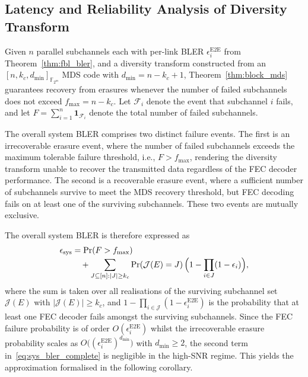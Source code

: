 \documentclass[lettersize,journal]{IEEEtran}
\begin{document}
\subsection{Latency and Reliability Analysis of Diversity Transform}
\label{sec:latency_reliability}

Given $n$ parallel subchannels each with per-link BLER
$\epsilon_i^{\mathrm{E2E}}$ from Theorem~\ref{thm:fbl_bler}, and a
diversity transform constructed from an
$[n, k_c, d_{\min}]_{\mathbb{F}_{2^m}}$ MDS code with
$d_{\min} = n - k_c + 1$, Theorem~\ref{thm:block_mds} guarantees
recovery from erasures whenever the number of failed subchannels does not
exceed $f_{\max} = n - k_c$. Let $\mathcal{F}_i$ denote the event
that subchannel $i$ fails, and let
$F = \sum_{i=1}^n \mathbf{1}_{\mathcal{F}_i}$ denote the total
number of failed subchannels.

The overall system BLER comprises two distinct failure events.
The first is an irrecoverable erasure event, where the number of
failed subchannels exceeds the maximum tolerable failure threshold,
i.e., $F > f_{\max}$, rendering the diversity transform unable to
recover the transmitted data regardless of the FEC decoder
performance. The second is a recoverable erasure event, where a
sufficient number of subchannels survive to meet the MDS recovery
threshold, but FEC decoding fails on at least one of the surviving
subchannels. These two events are mutually exclusive.

The overall system BLER is therefore expressed as
\begin{equation}
\begin{aligned}
\epsilon_{\mathrm{sys}} &= \Pr\!\left(F > f_{\max}\right) \\[-2pt]
&\quad + \sum_{J\subseteq[n]:|J|\geq k_c}
\Pr\!\left(\mathcal{J}(E)=J\right)
\Bigl(1 - \prod_{i\in J}(1-\epsilon_i)\Bigr),
\label{eq:sys_bler_complete}
\end{aligned}
\end{equation}
where the sum is taken over all realisations of the surviving
subchannel set $\mathcal{J}(E)$ with $|\mathcal{J}(E)| \geq k_c$,
and $1 - \prod_{i \in \mathcal{J}}(1-\epsilon_i^{\mathrm{E2E}})$
is the probability that at least one FEC decoder fails amongst the
surviving subchannels. Since the FEC failure probability is of order
$O(\epsilon_i^{\mathrm{E2E}})$ whilst the irrecoverable erasure
probability scales as
$O\bigl((\epsilon_i^{\mathrm{E2E}})^{d_{\min}}\bigr)$ with
$d_{\min} \geq 2$, the second term
in~\eqref{eq:sys_bler_complete} is negligible in the high-SNR
regime. This yields the approximation formalised in the following
corollary.
\end{document}
